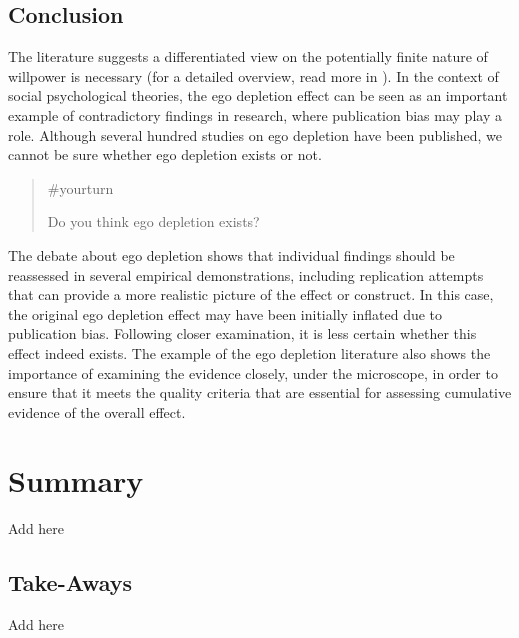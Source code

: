 \documentclass[
  letterpaper,
]{book}
\begin{document}
\section{Conclusion}\label{conclusion}

The literature suggests a differentiated view on the potentially finite
nature of willpower is necessary (for a detailed overview, read more in
). In the context of social
psychological theories, the ego depletion effect can be seen as an
important example of contradictory findings in research, where
publication bias may play a role. Although several hundred studies on
ego depletion have been published, we cannot be sure whether ego
depletion exists or not.

\begin{quote}
{\#yourturn}

Do you think ego depletion exists?
\end{quote}

The debate about ego depletion shows that individual findings should be
reassessed in several empirical demonstrations, including replication
attempts that can provide a more realistic picture of the effect or
construct. In this case, the original ego depletion effect may have been
initially inflated due to publication bias. Following closer
examination, it is less certain whether this effect indeed exists. The
example of the ego depletion literature also shows the importance of
examining the evidence closely, under the microscope, in order to ensure
that it meets the quality criteria that are essential for assessing
cumulative evidence of the overall effect.


\chapter*{\texorpdfstring{{Summary}}{Summary}}\label{summary}


Add here

\section*{Take-Aways}\label{take-aways}


Add here
\end{document}
